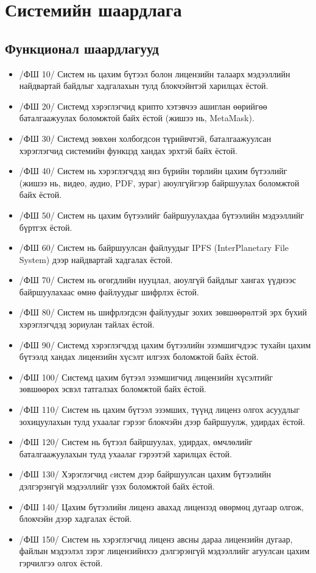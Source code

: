 \section{Системийн шаардлага}

\subsection{Функционал шаардлагууд}
\begin{itemize}
      \item[] /ФШ 10/ Систем нь цахим бүтээл болон лицензийн талаарх мэдээллийн найдвартай байдлыг хадгалахын тулд блокчэйнтэй харилцах ёстой.
      \item[] /ФШ 20/ Системд хэрэглэгчид крипто хэтэвчээ ашиглан өөрийгөө баталгаажуулах боломжтой байх ёстой (жишээ нь, MetaMask).
      \item[] /ФШ 30/ Системд зөвхөн холбогдсон түрийвчтэй, баталгаажуулсан хэрэглэгчид системийн функцэд хандах эрхтэй байх ёстой.
      \item[] /ФШ 40/ Систем нь хэрэглэгчдэд янз бүрийн төрлийн цахим бүтээлийг (жишээ нь, видео, аудио, PDF, зураг) аюулгүйгээр байршуулах боломжтой байх ёстой.
      \item[] /ФШ 50/ Систем нь цахим бүтээлийг байршуулахдаа бүтээлийн мэдээллийг бүртгэх ёстой.
      \item[] /ФШ 60/ Систем нь байршуулсан файлуудыг IPFS (InterPlanetary File System) дээр найдвартай хадгалах ёстой.
      \item[] /ФШ 70/ Систем нь өгөгдлийн нууцлал, аюулгүй байдлыг хангах үүднээс байршуулахаас өмнө файлуудыг шифрлэх ёстой.
      \item[] /ФШ 80/ Систем нь шифрлэгдсэн файлуудыг зохих зөвшөөрөлтэй эрх бүхий хэрэглэгчдэд зориулан тайлах ёстой.
      \item[] /ФШ 90/ Системд хэрэглэгчдэд цахим бүтээлийн эзэмшигчдээс тухайн цахим бүтээлд хандах лицензийн хүсэлт илгээх боломжтой байх ёстой.
      \item[] /ФШ 100/  Системд цахим бүтээл эзэмшигчид лицензийн хүсэлтийг зөвшөөрөх эсвэл татгалзах боломжтой байх ёстой.
      \item[] /ФШ 110/  Систем нь цахим бүтээл эзэмших, түүнд лиценз олгох асуудлыг зохицуулахын тулд ухаалаг гэрээг блокчэйн дээр байршуулж, удирдах ёстой.
      \item[] /ФШ 120/  Систем нь бүтээл байршуулах, удирдах, өмчлөлийг баталгаажуулахын тулд ухаалаг гэрээтэй харилцах ёстой.
      \item[] /ФШ 130/  Хэрэглэгчид cистем дээр байршуулсан цахим бүтээлийн дэлгэрэнгүй мэдээллийг үзэх боломжтой байх ёстой.
      \item[] /ФШ 140/  Цахим бүтээлийн лиценз авахад лицензэд өвөрмөц дугаар олгож, блокчэйн дээр хадгалах ёстой.
      \item[] /ФШ 150/  Систем нь хэрэглэгчид лиценз авсны дараа лицензийн дугаар, файлын мэдээлэл зэрэг лицензийнхээ дэлгэрэнгүй мэдээллийг агуулсан цахим гэрчилгээ олгох ёстой.
\end{itemize}

